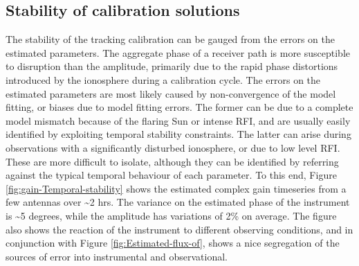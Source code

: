 \documentclass{aa}
\begin{document}
\subsection{\label{sub:Stability}Stability of calibration solutions}
The stability of  the tracking calibration can be gauged from  the errors on the
estimated parameters. The aggregate phase of a receiver path is more susceptible
to disruption than  the amplitude, primarily due to  the rapid phase distortions
introduced  by the  ionosphere during  a calibration  cycle. The  errors  on the
estimated  parameters are  most likely  caused by  non-convergence of  the model
fitting, or  biases due  to model  fitting errors. The  former can  be due  to a
complete  model mismatch  because of  the flaring  Sun or  intense RFI,  and are
usually  easily identified  by exploiting  temporal stability  constraints.  The
latter can arise during  observations with a significantly disturbed ionosphere,
or due to low level RFI.  These are more difficult to isolate, although they can
be  identified by  referring  against  the typical  temporal  behaviour of  each
parameter.   To  this end,  Figure  \ref{fig:gain-Temporal-stability} shows  the
estimated complex  gain timeseries from  a few antennas  over \textasciitilde{}2
hrs.    The   variance  on   the   estimated   phase   of  the   instrument   is
\textasciitilde{}5  degrees,  while  the  amplitude  has variations  of  2\%  on
average.   The figure also  shows the  reaction of  the instrument  to different
observing      conditions,     and      in      conjunction     with      Figure
\ref{fig:Estimated-flux-of}, shows  a nice segregation  of the sources  of error
into instrumental and observational.
\end{document}
